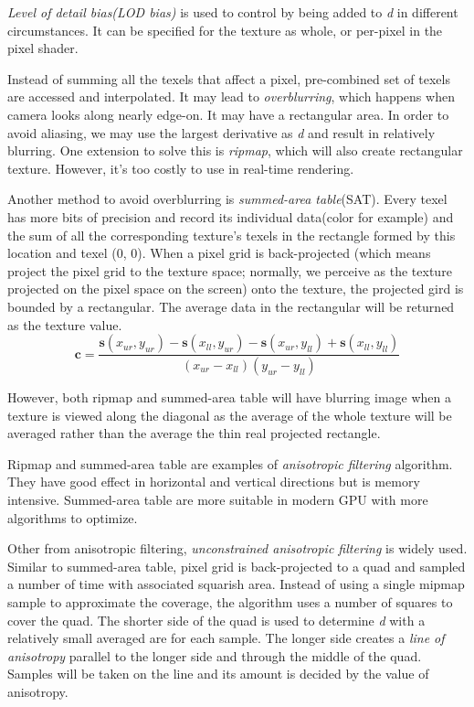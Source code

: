 \documentclass[10pt, a4paper]{article}
\begin{document}
    \emph{Level of detail bias(LOD bias)} is used to control by being added to \emph{d} in different circumstances. It can be specified for the texture as whole, or per-pixel in the pixel shader. 

    Instead of summing all the texels that affect a pixel, pre-combined set of texels are accessed and interpolated. It may lead to \emph{overblurring}, which happens when camera looks along nearly edge-on. It may have a rectangular area. In order to avoid aliasing, we may use the largest derivative as \emph{d} and result in relatively blurring. One extension to solve this is \emph{ripmap}, which will also create rectangular texture. However, it's too costly to use in real-time rendering. 

    Another method to avoid overblurring is \emph{summed-area table}(SAT). Every texel has more bits of precision and record its individual data(color for example) and the sum of all the corresponding texture's texels in the rectangle formed by this location and texel (0, 0). When a pixel grid is back-projected (which means project the pixel grid to the texture space; normally, we perceive as the texture projected on the pixel space on the screen) onto the texture, the projected gird is bounded by a rectangular. The average data in the rectangular will be returned as the texture value. 
    $$\textbf{c} = \frac{\textbf{s}(x_{ur}, y_{ur}) - \textbf{s}(x_{ll}, y_{ur}) - \textbf{s}(x_{ur}, y_{ll}) + \textbf{s}(x_{ll}, y_{ll})}{(x_{ur} - x_{ll})(y_{ur} - y_{ll})}$$

    However, both ripmap and summed-area table will have blurring image when a texture is viewed along the diagonal as the average of the whole texture will be averaged rather than the average the thin real projected rectangle. 

    Ripmap and  summed-area table are examples of \emph{anisotropic filtering} algorithm. They have good effect in horizontal and vertical directions but is memory intensive.  Summed-area table are more suitable in modern GPU with more algorithms to optimize. 

    Other from anisotropic filtering, \emph{unconstrained anisotropic filtering} is widely used. Similar to summed-area table, pixel grid is back-projected to a quad and sampled a number of time with associated squarish area. Instead of using a single mipmap sample to approximate the coverage, the algorithm uses a number of squares to cover the quad. The shorter side of the quad is used to determine \emph{d} with a relatively small averaged are for each sample. The longer side creates a \emph{line of anisotropy} parallel to the longer side and through the middle of the quad. Samples will be taken on the line and its amount is decided by the value of anisotropy. 
    
\end{document}

